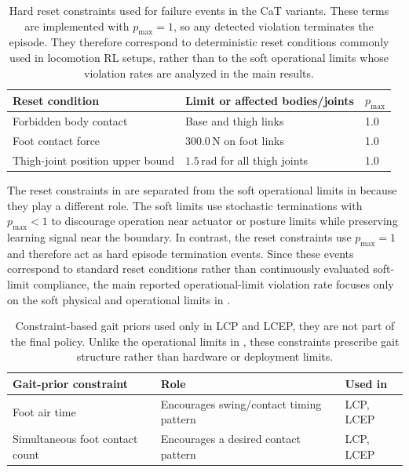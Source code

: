 \documentclass{article}
\newcommand{\baselineOne}{LCP}
\newcommand{\baselineThree}{LCEP}
\begin{document}
    \begin{table}[htbp]
        \centering
        \small
        \caption{Hard reset constraints used for failure events in the CaT variants. These terms are implemented with \(p_{\max}=1\), so any detected violation terminates the episode. They therefore correspond to deterministic reset conditions commonly used in locomotion RL setups, rather than to the soft operational limits whose violation rates are analyzed in the main results.}
        \label{tab:appendix-reset-constraints}
        \begin{tabular}{lll}
            \toprule
            \textbf{Reset condition} & \textbf{Limit or affected bodies/joints} & \(p_{\max}\) \\
            \midrule
            Forbidden body contact & Base and thigh links & 1.0 \\
            Foot contact force & \(300.0\,\mathrm{N}\) on foot links & 1.0 \\
            Thigh-joint position upper bound & \(1.5\,\mathrm{rad}\) for all thigh joints & 1.0 \\
            \bottomrule
        \end{tabular}
    \end{table}
    
    The reset constraints in  are separated from the soft operational limits in  because they play a different role. The soft limits use stochastic terminations with \(p_{\max}<1\) to discourage operation near actuator or posture limits while preserving learning signal near the boundary. In contrast, the reset constraints use \(p_{\max}=1\) and therefore act as hard episode termination events. Since these events correspond to standard reset conditions rather than continuously evaluated soft-limit compliance, the main reported operational-limit violation rate focuses only on the soft physical and operational limits in .

    \begin{table}[htbp]
        \centering
        \small
        \caption{Constraint-based gait priors used only in \baselineOne{} and \baselineThree, they are not part of the final policy. Unlike the operational limits in , these constraints prescribe gait structure rather than hardware or deployment limits.}
        \label{tab:appendix-gait-prior-constraints}
        \begin{tabular}{lll}
            \toprule
            \textbf{Gait-prior constraint} & \textbf{Role} & \textbf{Used in} \\
            \midrule
            Foot air time & Encourages swing/contact timing pattern & \baselineOne, \baselineThree \\
            Simultaneous foot contact count & Encourages a desired contact pattern & \baselineOne, \baselineThree \\
            \bottomrule
        \end{tabular}
    \end{table}
\end{document}
